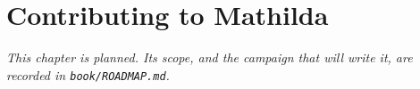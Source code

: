 \chapter{Contributing to Mathilda}
\label{ch:contributing}

\emph{This chapter is planned. Its scope, and the campaign that will write
it, are recorded in \texttt{book/ROADMAP.md}.}
